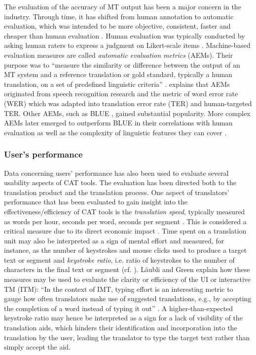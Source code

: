 The evaluation of the accuracy of MT output has been a major concern in the industry. Through time, it has shifted from human annotation to automatic evaluation, which was intended to be more objective, consistent, faster and cheaper than human evaluation \citep{doherty2019translation}. Human evaluation was typically conducted by asking human raters to express a judgment on Likert-scale items \citep[340]{doherty2019translation}. Machine-based evaluation measures are called \textit{automatic evaluation metrics} (AEMs). Their purpose was to ``measure the similarity or difference between the output of an MT system and a reference translation or gold standard, typically a human translation, on a set of predefined linguistic criteria'' \citep[344]{doherty2019translation}. \citet[344--345]{doherty2019translation} explains that AEMs originated from speech recognition research and the metric of word error rate (WER) which was adapted into translation error rate (TER) and human-targeted TER. Other AEMs, such as BLUE \citep{papineni2002bleu}, gained substantial popularity. More complex AEMs later emerged to outperform BLUE in their correlations with human evaluation as well as the complexity of linguistic features they can cover \citep[345]{doherty2019translation}.

\subsubsection{User's performance}

Data concerning users’ performance has also been used to evaluate several usability aspects of CAT tools. The evaluation has been directed both to the translation product and the translation process. One aspect of translators’ performance that has been evaluated to gain insight into the effectiveness/efficiency of CAT tools is the \textit{translation speed}, typically measured as words per hour, seconds per word, seconds per segment \citep{laubli2019translation}. This is considered a critical measure due to its direct economic impact \citep[375]{laubli2019translation}. Time spent on a translation unit may also be interpreted as a sign of mental effort and measured, for instance, as the number of keystrokes and mouse clicks used to produce a target text or segment and \textit{keystroke ratio}, i.e. ratio of keystrokes to the number of characters in the final text or segment (cf. \cite{koponen2012post}). Läubli and Green explain how these measures may be used to evaluate the clarity or efficiency of the UI or interactive TM (ITM): ``In the context of IMT, typing effort is an interesting metric to gauge how often translators make use of suggested translations, e.g., by accepting the completion of a word instead of typing it out'' \citep[375]{laubli2019translation}. A higher-than-expected keystroke ratio may hence be interpreted as a sign for a lack of visibility of the translation aids, which hinders their identification and incorporation into the translation by the user, leading the translator to type the target text rather than simply accept the aid.

